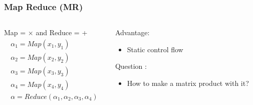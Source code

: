 \documentclass{beamer}
\begin{document}
\begin{frame}
    \frametitle{Map Reduce (MR)}
    \begin{columns}[T]
        \begin{column}{0.5\textwidth}  %
            \begin{minipage}[t][.5\textheight]{\textwidth}
                \begin{center}
                    
                \end{center}
            \end{minipage}\par
            \begin{minipage}[t][.5\textheight]{\textwidth}
                Map = $\times$ and Reduce = +
                \begin{equation*}
                    \begin{split}
                        \alpha _1 = Map(x_1, y_1) \\
                        \alpha _2 = Map(x_2, y_2) \\
                        \alpha _3 = Map(x_3, y_3) \\
                        \alpha _4 = Map(x_4, y_4) \\
                        \alpha = Reduce(\alpha _1, \alpha _2, \alpha _3, \alpha _4)
                    \end{split}
                \end{equation*}
            \end{minipage}
        \end{column}
        \begin{column}{0.5\textwidth}
            \begin{minipage}[t][.5\textheight]{\textwidth}
                \begin{center}
                    
                \end{center}
            \end{minipage}\par
            \begin{minipage}[t][.5\textheight]{\textwidth}
                Advantage:
                \begin{itemize}
                    \item Static control flow
                \end{itemize}
                Question :
                \begin{itemize}
                    \item How to make a matrix product with it?
                \end{itemize}
            \end{minipage}
        \end{column}
    \end{columns}
\end{frame}
\end{document}
